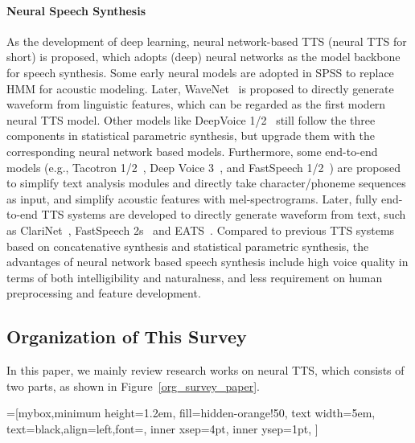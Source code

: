 \documentclass{article}
\begin{document}
\paragraph{Neural Speech Synthesis}
As the development of deep learning, neural network-based TTS (neural TTS for short) is proposed, which adopts (deep) neural networks as the model backbone for speech synthesis. Some early neural models are adopted in SPSS to replace HMM for acoustic modeling. Later, WaveNet~\cite{oord2016wavenet} is proposed to directly generate waveform from linguistic features, which can be regarded as the first modern neural TTS model. Other models like DeepVoice 1/2~\cite{arik2017deep,gibiansky2017deep} still follow the three components in statistical parametric synthesis, but upgrade them with the corresponding neural network based models. Furthermore, some end-to-end models (e.g., Tacotron 1/2~\cite{wang2017tacotron,shen2018natural}, Deep Voice 3~\cite{ping2018deep}, and FastSpeech 1/2~\cite{ren2019fastspeech,ren2021fastspeech}) are proposed to simplify text analysis modules and directly take character/phoneme sequences as input, and simplify acoustic features with mel-spectrograms. Later, fully end-to-end TTS systems are developed to directly generate waveform from text, such as ClariNet~\cite{ping2018clarinet}, FastSpeech 2s~\cite{ren2021fastspeech} and EATS~\cite{donahue2020end}. Compared to previous TTS systems based on concatenative synthesis and statistical parametric synthesis, the advantages of neural network based speech synthesis include high voice quality in terms of both intelligibility and naturalness, and less requirement on human preprocessing and feature development. 

\subsection{Organization of This Survey}
In this paper, we mainly review research works on neural TTS, which consists of two parts, as shown in Figure~\ref{org_survey_paper}. 


=[mybox,minimum height=1.2em,
fill=hidden-orange!50, text width=5em,  text=black,align=left,font=\footnotesize,
inner xsep=4pt,
inner ysep=1pt,
]
\end{document}
